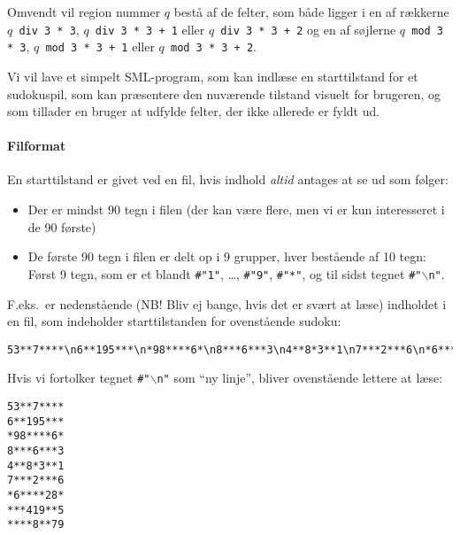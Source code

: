 \documentclass[a4paper]{article}
\begin{document}
Omvendt vil region nummer $q$ best{\aa} af de felter,\newline
som b{\aa}de ligger i en af r{\ae}kkerne
\texttt{$q$ div 3 * 3}, \texttt{$q$ div 3 * 3 + 1}
eller \texttt{$q$ div 3 * 3 + 2}\newline
og en af s{\o}jlerne
\texttt{$q$ mod 3 * 3}, \texttt{$q$ mod 3 * 3 + 1} eller \texttt{$q$ mod 3 * 3 + 2}.

Vi vil lave et simpelt SML-program, som kan indl{\ae}se en starttilstand
for et sudokuspil, som kan pr{\ae}sentere den nuv{\ae}rende tilstand visuelt
for brugeren, og som tillader en bruger at udfylde felter, der ikke allerede er
fyldt ud.

\paragraph{Filformat}

En starttilstand er givet ved en fil, hvis indhold \emph{altid}
antages at se ud som f{\o}lger:

\begin{itemize}

\item Der er mindst 90 tegn i filen (der kan v{\ae}re flere, men vi er kun interesseret i de 90 f{\o}rste)

\item De f{\o}rste 90 tegn i filen er delt op i 9 grupper,
hver best{\aa}ende af 10 tegn:
F{\o}rst 9 tegn, som er et blandt
\texttt{\#"1"}, \ldots, \texttt{\#"9"}, \texttt{\#"*"},
og til sidst tegnet \texttt{\#"$\backslash$n"}.

\end{itemize}

F.eks.\ er nedenst{\aa}ende (NB! Bliv ej bange, hvis det er sv{\ae}rt at l{\ae}se)
indholdet i en fil, som indeholder starttilstanden for ovenst{\aa}ende sudoku:

\begin{center}
{\footnotesize
\begin{verbatim}
53**7****\n6**195***\n*98****6*\n8***6***3\n4**8*3**1\n7***2***6\n*6****28*\n***419**5\n****8**79\n
\end{verbatim}
}
\end{center}

Hvis vi fortolker tegnet \texttt{\#"$\backslash$n"} som ``ny linje'',
bliver ovenst{\aa}ende lettere at l{\ae}se:

\begin{center}
\begin{verbatim}
53**7****
6**195***
*98****6*
8***6***3
4**8*3**1
7***2***6
*6****28*
***419**5
****8**79
\end{verbatim}
\end{center}
\end{document}
